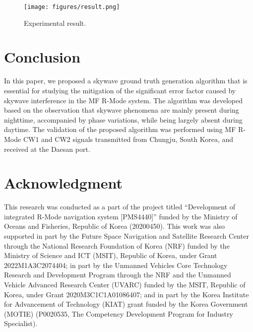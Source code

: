 \documentclass[conference]{IEEEtran}
\begin{document}
\begin{figure}
    \centering
    \texttt{[image: figures/result.png]}
    \caption{Experimental result.}
    \label{fig:result}
\end{figure}


\section{Conclusion}

In this paper, we proposed a skywave ground truth generation algorithm that is essential for studying the mitigation of the significant error factor caused by skywave interference in the MF R-Mode system. 
The algorithm was developed based on the observation that skywave phenomena are mainly present during nighttime, accompanied by phase variations, while being largely absent during daytime. 
The validation of the proposed algorithm was performed using MF R-Mode CW1 and CW2 signals transmitted from Chungju, South Korea, and received at the Daesan port.


\section*{Acknowledgment}

This research was conducted as a part of the project titled ``Development of integrated R-Mode navigation system [PMS4440]'' funded by the Ministry of Oceans and Fisheries, Republic of Korea (20200450).
This work was also supported in part by the Future Space Navigation and Satellite Research Center through the National Research Foundation of Korea (NRF) funded by the Ministry of Science and ICT (MSIT), Republic of Korea, under Grant 2022M1A3C2074404; in part by the Unmanned Vehicles Core Technology Research and Development Program through the NRF and the Unmanned Vehicle Advanced Research Center (UVARC) funded by the MSIT, Republic of Korea, under Grant 2020M3C1C1A01086407; and in part by the Korea Institute for Advancement of Technology (KIAT) grant funded by the Korea Government (MOTIE) (P0020535, The Competency Development Program for Industry Specialist).




\vspace{12pt}
\end{document}
